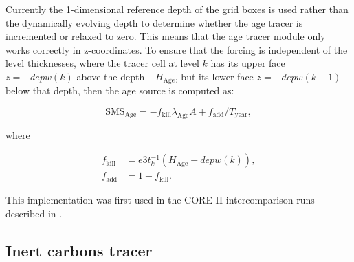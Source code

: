 \documentclass[../main/TOP_manual]{subfiles}
\begin{document}
Currently the 1-dimensional reference depth of the grid boxes is used rather than the dynamically evolving depth to determine whether the age tracer is incremented or relaxed to zero.
This means that the age tracer module only works correctly in z-coordinates.
To ensure that the forcing is independent of the level thicknesses, where the tracer cell at level $k$ has its upper face $z=-depw(k)$ above the depth $-H_{\mathrm{Age}}$, but its lower face $z=-depw(k+1)$ below that depth, then the age source is computed as:

\begin{equation}
  \label{eq:TOP-age-mixed}
   \mathrm{SMS_{\mathrm{Age}}} = -f_{\mathrm{kill}}\lambda_{\mathrm{Age}}A +f_{\mathrm{add}}/T_{\mathrm{year}} ,
\end{equation}

where

\begin{align}
    f_{\mathrm{kill}} &= e3t_k^{-1}(H_{\mathrm{Age}} - depw(k)) , \\
    f_{\mathrm{add}} &= 1 - f_{\mathrm{kill}}.
\end{align}

This implementation was first used in the CORE-II intercomparison runs described in \citet{danabasoglu_2014}.

\subsection{Inert carbons tracer}

%
\end{document}

